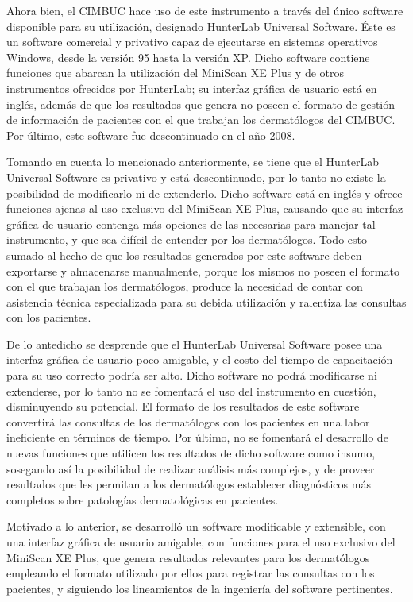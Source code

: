 Ahora bien, el CIMBUC hace uso de este instrumento a trav\'{e}s del \'{u}nico software disponible para su utilizaci\'{o}n, designado HunterLab Universal Software. \'{E}ste es un software comercial y privativo capaz de ejecutarse en sistemas operativos Windows, desde la versi\'{o}n 95 hasta la versi\'{o}n XP. Dicho software contiene funciones que abarcan la utilizaci\'{o}n del MiniScan XE Plus y de otros instrumentos ofrecidos por HunterLab; su interfaz gr\'{a}fica de usuario est\'{a} en ingl\'{e}s, adem\'{a}s de que los resultados que genera no poseen el formato de gesti\'{o}n de informaci\'{o}n de pacientes con el que trabajan los dermat\'{o}logos del CIMBUC. Por \'{u}ltimo, este software fue descontinuado en el a\~{n}o 2008.

Tomando en cuenta lo mencionado anteriormente, se tiene que el HunterLab Universal Software es privativo y est\'{a} descontinuado, por lo tanto no existe la posibilidad de modificarlo ni de extenderlo. Dicho software est\'{a} en ingl\'{e}s y ofrece funciones ajenas al uso exclusivo del MiniScan XE Plus, causando que su interfaz gr\'{a}fica de usuario contenga m\'{a}s opciones de las necesarias para manejar tal instrumento, y que sea dif\'{i}cil de entender por los dermat\'{o}logos. Todo esto sumado al hecho de que los resultados generados por este software deben exportarse y almacenarse manualmente, porque los mismos no poseen el formato con el que trabajan los dermat\'{o}logos, produce la necesidad de contar con asistencia t\'{e}cnica especializada para su debida utilizaci\'{o}n y ralentiza las consultas con los pacientes.

De lo antedicho se desprende que el HunterLab Universal Software posee una interfaz gr\'{a}fica de usuario poco amigable, y el costo del tiempo de capacitaci\'{o}n para su uso correcto podr\'{i}a ser alto. Dicho software no podr\'{a} modificarse ni extenderse, por lo tanto no se fomentar\'{a} el uso del instrumento en cuesti\'{o}n, disminuyendo su potencial. El formato de los resultados de este software convertir\'{a} las consultas de los dermat\'{o}logos con los pacientes en una labor ineficiente en t\'{e}rminos de tiempo. Por \'{u}ltimo, no se fomentar\'{a} el desarrollo de nuevas funciones que utilicen los resultados de dicho software como insumo, sosegando as\'{i} la posibilidad de realizar an\'{a}lisis m\'{a}s complejos, y de proveer resultados que les permitan a los dermat\'{o}logos establecer diagn\'{o}sticos m\'{a}s completos sobre patolog\'{i}as dermatol\'{o}gicas en pacientes.

Motivado a lo anterior, se desarroll\'{o} un software modificable y extensible, con una interfaz gr\'{a}fica de usuario amigable, con funciones para el uso exclusivo del MiniScan XE Plus, que genera resultados relevantes para los dermat\'{o}logos empleando el formato utilizado por ellos para registrar las consultas con los pacientes, y siguiendo los lineamientos de la ingenier\'{i}a del software pertinentes.

